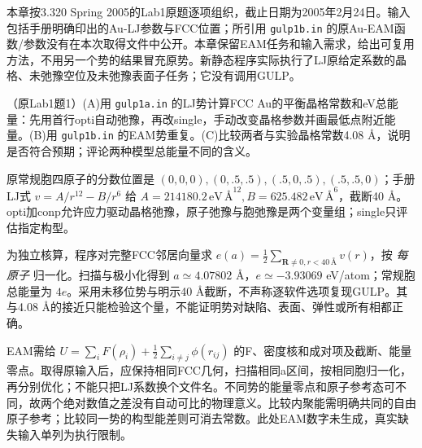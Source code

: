 本章按3.320 Spring 2005的Lab1原题逐项组织，截止日期为2005年2月24日。输入包括手册明确印出的Au-LJ参数与FCC位置；所引用 \texttt{gulp1b.in} 的原Au-EAM函数/参数没有在本次取得文件中公开。本章保留EAM任务和输入需求，给出可复用方法，不用另一个势的结果冒充原势。新静态程序实际执行了LJ原给定系数的晶格、未弛豫空位及未弛豫表面子任务；它没有调用GULP。

\begin{exercise}\label{task:lab1-1}
（原Lab1题1）(A)用 \texttt{gulp1a.in} 的LJ势计算FCC Au的平衡晶格常数和eV总能量：先用首行opti自动弛豫，再改single，手动改变晶格参数并画最低点附近能量。(B)用 \texttt{gulp1b.in} 的EAM势重复。(C)比较两者与实验晶格常数4.08 \AA{}，说明是否符合预期；评论两种模型总能量不同的含义。
\end{exercise}
\begin{solution}
原常规胞四原子的分数位置是 $(0,0,0),(0,.5,.5),(.5,0,.5),(.5,.5,0)$；手册LJ式 $v=A/r^{12}-B/r^6$ 给 $A=214180.2\,\text{eV}\,\text{\AA}^{12},B=625.482\,\text{eV}\,\text{\AA}^6$，截断40 \AA{}。opti加conp允许应力驱动晶格弛豫，原子弛豫与胞弛豫是两个变量组；single只评估指定构型。

为独立核算，程序对完整FCC邻居向量求 $e(a)=\tfrac12\sum_{\mathbf R\ne0,r<40\,\text{\AA}}v(r)$，按 \emph{每原子} 归一化。扫描与极小化得到 $a\simeq4.07802$ \AA{}，$e\simeq-3.93069$ eV/atom；常规胞总能量为 $4e$。采用未移位势与明示40 \AA{}截断，不声称逐软件选项复现GULP。其与4.08 \AA{}的接近只能检验这个量，不能证明势对缺陷、表面、弹性或所有相都正确。
\begin{center}\end{center}

EAM需给 $U=\sum_iF(\rho_i)+\tfrac12\sum_{i\ne j}\phi(r_{ij})$ 的F、密度核和成对项及截断、能量零点。取得原输入后，应保持相同FCC几何，扫描相同a区间，按相同胞归一化，再分别优化；不能只把LJ系数换个文件名。不同势的能量零点和原子参考态可不同，故两个绝对数值之差没有自动可比的物理意义。比较内聚能需明确共同的自由原子参考；比较同一势的构型能差则可消去常数。此处EAM数字未生成，真实缺失输入单列为执行限制。
\end{solution}

